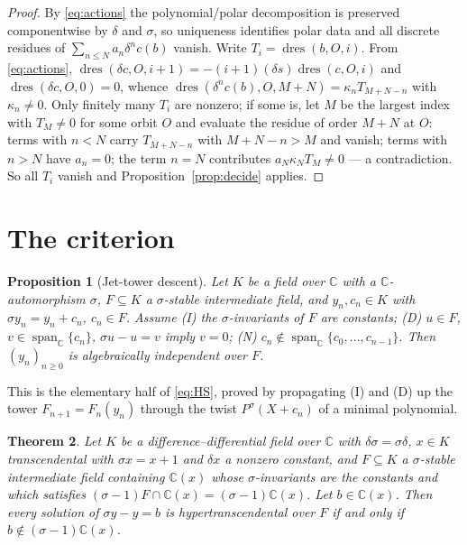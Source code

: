 \documentclass[11pt,a4paper]{amsart}
\theoremstyle{plain}
\newtheorem{theorem}{Theorem}[section]
\newtheorem{proposition}[theorem]{Proposition}
\theoremstyle{definition}
\newcommand{\CC}{\mathbb{C}}
\newcommand{\sig}{\sigma}
\newcommand{\dd}{\delta}
\newcommand{\dres}{\operatorname{dres}}
\begin{document}
\begin{proof}
By \eqref{eq:actions} the polynomial/polar decomposition is preserved componentwise by $\dd$ and
$\sig$, so uniqueness identifies polar data and all discrete residues of $\sum_{n\le N}a_n\dd^nc(b)$
vanish. Write $T_i=\dres(b,O,i)$. From \eqref{eq:actions},
$\dres(\dd c,O,i+1)=-(i+1)(\dd s)\dres(c,O,i)$ and $\dres(\dd c,O,0)=0$, whence
$\dres(\dd^nc(b),O,M+N)=\kappa_nT_{M+N-n}$ with $\kappa_n\neq0$. Only finitely many $T_i$ are
nonzero; if some is, let $M$ be the largest index with $T_M\neq0$ for some orbit $O$ and evaluate the
residue of order $M+N$ at $O$: terms with $n<N$ carry $T_{M+N-n}$ with $M+N-n>M$ and vanish; terms
with $n>N$ have $a_n=0$; the term $n=N$ contributes $a_N\kappa_NT_M\neq0$ --- a contradiction. So all
$T_i$ vanish and Proposition~\ref{prop:decide} applies.
\end{proof}

\section{The criterion}\label{sec:main}

\begin{proposition}[Jet-tower descent]\label{prop:tower}
Let $K$ be a field over $\CC$ with a $\CC$-automorphism $\sig$, $F\subseteq K$ a $\sig$-stable
intermediate field, and $y_n,c_n\in K$ with $\sig y_n=y_n+c_n$, $c_n\in F$. Assume
\textup{(I)} the $\sig$-invariants of $F$ are constants;
\textup{(D)} $u\in F$, $v\in\operatorname{span}_{\CC}\{c_n\}$, $\sig u-u=v$ imply $v=0$;
\textup{(N)} $c_n\notin\operatorname{span}_\CC\{c_0,\dots,c_{n-1}\}$.
Then $(y_n)_{n\ge0}$ is algebraically independent over $F$.
\end{proposition}

This is the elementary half of \eqref{eq:HS}, proved by propagating (I) and (D) up the tower
$F_{n+1}=F_n(y_n)$ through the twist $P^{\sig}(X+c_n)$ of a minimal polynomial.

\begin{theorem}\label{thm:main}
Let $K$ be a difference--differential field over $\CC$ with $\dd\sig=\sig\dd$, $x\in K$
transcendental with $\sig x=x+1$ and $\dd x$ a nonzero constant, and $F\subseteq K$ a $\sig$-stable
intermediate field containing $\CC(x)$ whose $\sig$-invariants are the constants and which satisfies
$(\sig-1)F\cap\CC(x)=(\sig-1)\CC(x)$. Let $b\in\CC(x)$. Then every solution of $\sig y-y=b$ is
hypertranscendental over $F$ if and only if $b\notin(\sig-1)\CC(x)$.
\end{theorem}
\end{document}
